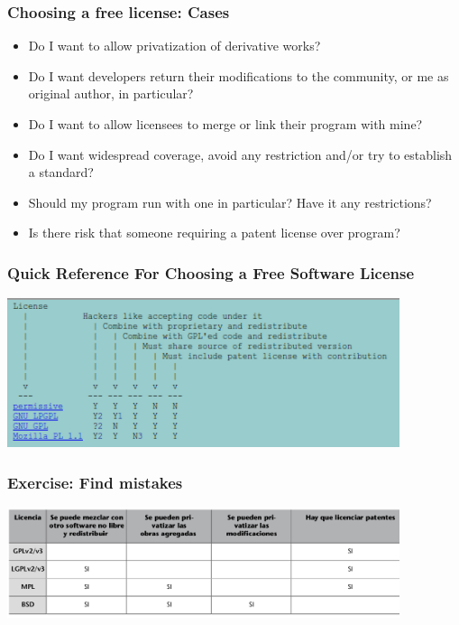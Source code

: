 \documentclass{beamer}
\begin{document}
\begin{frame}
\frametitle{Choosing a free license: Cases}

\begin{itemize}
\item Do I want to allow privatization of derivative works?
\pause
\item Do I want developers return their modifications to the community, or me as original author, in particular?
\pause
\item Do I want to allow licensees to merge or link their program with mine?
\pause
\item Do I want widespread coverage, avoid any restriction and/or try to establish a standard?
\pause
\item Should my program run with one in particular? Have it any restrictions?
\pause
\item Is there risk that someone requiring a patent license over program?
\end{itemize}


\end{frame}


\begin{frame}
\frametitle{Quick Reference For Choosing a Free Software License}

\begin{center}
\includegraphics[width=11.5cm]{figs/licenses_quick_reference.png}
\end{center}

\end{frame}


\begin{frame}
\frametitle{Exercise: Find mistakes}

\begin{center}
\includegraphics[width=11.5cm]{figs/tabla_licencias.png}
\end{center}

\end{frame}
\end{document}
